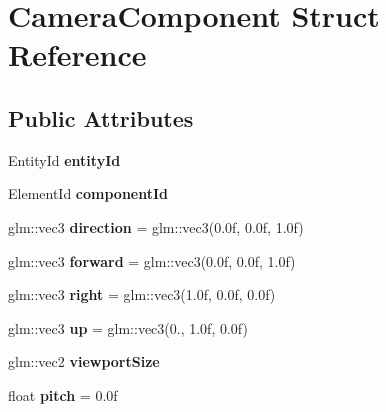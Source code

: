 \hypertarget{struct_camera_component}{}\section{Camera\+Component Struct Reference}
\label{struct_camera_component}
\subsection*{Public Attributes}
\begin{DoxyCompactItemize}
\item 
\hypertarget{struct_camera_component_a6cabfd0a26360caba0f38a23c0bce354}{}Entity\+Id {\bfseries entity\+Id}\label{struct_camera_component_a6cabfd0a26360caba0f38a23c0bce354}

\item 
\hypertarget{struct_camera_component_a9de6948b7499d6d214842b69e1f95855}{}Element\+Id {\bfseries component\+Id}\label{struct_camera_component_a9de6948b7499d6d214842b69e1f95855}

\item 
\hypertarget{struct_camera_component_ae106ba028a02a4f99b19f9ca10af17ce}{}glm\+::vec3 {\bfseries direction} = glm\+::vec3(0.\+0f, 0.\+0f, 1.\+0f)\label{struct_camera_component_ae106ba028a02a4f99b19f9ca10af17ce}

\item 
\hypertarget{struct_camera_component_a9ec51727d0c75fc7ee9aefbf790a83d1}{}glm\+::vec3 {\bfseries forward} = glm\+::vec3(0.\+0f, 0.\+0f, 1.\+0f)\label{struct_camera_component_a9ec51727d0c75fc7ee9aefbf790a83d1}

\item 
\hypertarget{struct_camera_component_a62040ca115beaa48627fe56d330647c0}{}glm\+::vec3 {\bfseries right} = glm\+::vec3(1.\+0f, 0.\+0f, 0.\+0f)\label{struct_camera_component_a62040ca115beaa48627fe56d330647c0}

\item 
\hypertarget{struct_camera_component_a639f14e0057198d84ed8de71c3df3303}{}glm\+::vec3 {\bfseries up} = glm\+::vec3(0., 1.\+0f, 0.\+0f)\label{struct_camera_component_a639f14e0057198d84ed8de71c3df3303}

\item 
\hypertarget{struct_camera_component_acac8dfce611858ae1b3df9fc5233fe6b}{}glm\+::vec2 {\bfseries viewport\+Size}\label{struct_camera_component_acac8dfce611858ae1b3df9fc5233fe6b}

\item 
\hypertarget{struct_camera_component_ab56cb75b0f826bd88f30fdcd359f1439}{}float {\bfseries pitch} = 0.\+0f\label{struct_camera_component_ab56cb75b0f826bd88f30fdcd359f1439}


\end{DoxyCompactItemize}
